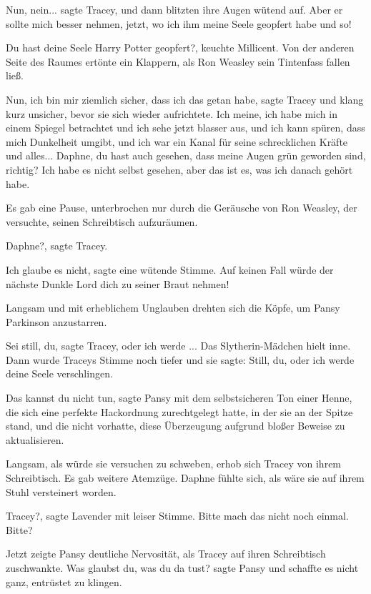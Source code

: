 \glqq Nun, nein...\grqq{} sagte Tracey, und dann blitzten ihre Augen wütend auf.
\glqq Aber er sollte mich besser nehmen, jetzt, wo ich ihm meine Seele geopfert
habe und so!\grqq{}

\glqq Du hast deine Seele Harry Potter geopfert?\grqq{}, keuchte Millicent. Von
der anderen Seite des Raumes ertönte ein Klappern, als Ron Weasley sein
Tintenfass fallen ließ.

\glqq Nun, ich bin mir ziemlich sicher, dass ich das getan habe\grqq{}, sagte
Tracey und klang kurz unsicher, bevor sie sich wieder aufrichtete. \glqq Ich
meine, ich habe mich in einem Spiegel betrachtet und ich sehe jetzt blasser aus,
und ich kann spüren, dass mich Dunkelheit umgibt, und ich war ein Kanal für
seine schrecklichen Kräfte und alles... Daphne, du hast auch gesehen, dass meine
Augen grün geworden sind, richtig? Ich habe es nicht selbst gesehen, aber das
ist es, was ich danach gehört habe.\grqq{}

Es gab eine Pause, unterbrochen nur durch die Geräusche von Ron Weasley, der
versuchte, seinen Schreibtisch aufzuräumen.

\glqq Daphne?\grqq{}, sagte Tracey.

\glqq Ich glaube es nicht\grqq{}, sagte eine wütende Stimme. \glqq Auf keinen
Fall würde der nächste Dunkle Lord dich zu seiner Braut nehmen!\grqq{}

Langsam und mit erheblichem Unglauben drehten sich die Köpfe, um Pansy Parkinson
anzustarren.

\glqq Sei still, du\grqq{}, sagte Tracey, \glqq oder ich werde ...\grqq{} Das
Slytherin-Mädchen hielt inne. Dann wurde Traceys Stimme noch tiefer und sie
sagte: \glqq Still, du, oder ich werde deine Seele verschlingen.\grqq{}

\glqq Das kannst du nicht tun\grqq{}, sagte Pansy mit dem selbstsicheren Ton
einer Henne, die sich eine perfekte Hackordnung zurechtgelegt hatte, in der sie
an der Spitze stand, und die nicht vorhatte, diese Überzeugung aufgrund bloßer
Beweise zu aktualisieren.

Langsam, als würde sie versuchen zu schweben, erhob sich Tracey von ihrem
Schreibtisch. Es gab weitere Atemzüge. Daphne fühlte sich, als wäre sie auf
ihrem Stuhl versteinert worden.

\glqq Tracey?\grqq{}, sagte Lavender mit leiser Stimme. \glqq Bitte mach das
nicht noch einmal. Bitte?\grqq{}

Jetzt zeigte Pansy deutliche Nervosität, als Tracey auf ihren Schreibtisch
zuschwankte. \glqq Was glaubst du, was du da tust?\grqq{} sagte Pansy und
schaffte es nicht ganz, entrüstet zu klingen.

